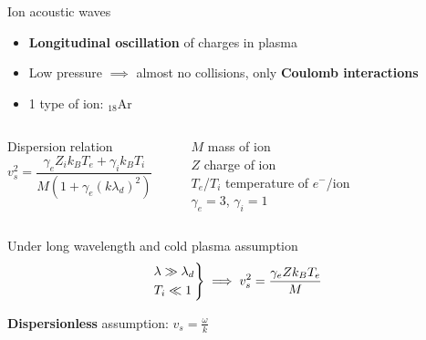 \documentclass[10pt]{beamer}
\newcommand{\electron}[0]{$e^{-}$}
\begin{document}
\begin{frame}{{Ion acoustic waves}}
    \begin{itemize}
        \item \textbf{Longitudinal oscillation} of charges in plasma
        \item Low pressure $\implies$ almost no collisions, only \textbf{Coulomb interactions}
        \item 1 type of ion: $_{18}$Ar
    \end{itemize}
    
    \vspace{0.5cm}
    \begin{columns}[T]
        \centering
        Dispersion relation \, 
        \begin{equation*}
            v_s^2 = \frac{\gamma_e Z_i k_B T_e + \gamma_i k_B T_i}{M(1+\gamma_e(k\lambda_d)^2)}
        \end{equation*}
        
        \rule{.2mm}{1.7cm}

        \vfill
        $M$ mass of ion \\
        $Z$ charge of ion \\
        $T_e$/$T_i$ temperature of \electron/ion \\
        $\gamma_e=3$, $\gamma_i=1$
        \vfill
    \end{columns}

    \vspace{0.8cm}
    Under long wavelength and cold plasma assumption
    \begin{equation*}
        \begin{rcases}
            \lambda \gg \lambda_d \\
            T_i \ll 1
        \end{rcases}
        \implies v_s^2 = \frac{\gamma_e Z k_B T_e}{M}
    \end{equation*}

    \textbf{Dispersionless} assumption: $v_s = \frac{\omega}{k}$
\end{frame}
\end{document}
